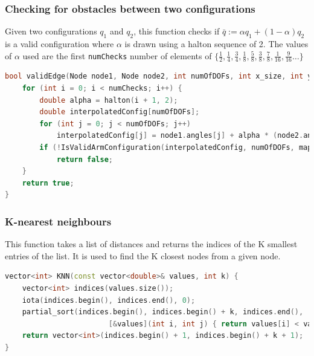 \documentclass[11pt]{article}
\begin{document}
\subsubsection{Checking for obstacles between two configurations}
Given two configurations $q_1$ and $q_2$, this function checks if $\bar{q} := \alpha q_1 + (1 - \alpha) q_2$
is a valid configuration where $\alpha$ is drawn using a halton sequence of 2. The values of $\alpha$
used are the first \texttt{numChecks} number of elements of $\{ \frac{1}{2}, \frac{1}{4}, \frac{3}{4}, \frac{1}{8}, \frac{5}{8}, \frac{3}{8}, \frac{7}{8}, \frac{1}{16}, \frac{9}{16}\dots \}$ 
\begin{lstlisting}[language=c++]
bool validEdge(Node node1, Node node2, int numOfDOFs, int x_size, int y_size, double *map, int numChecks){
    for (int i = 0; i < numChecks; i++) {
        double alpha = halton(i + 1, 2); 
        double interpolatedConfig[numOfDOFs];
        for (int j = 0; j < numOfDOFs; j++) 
            interpolatedConfig[j] = node1.angles[j] + alpha * (node2.angles[j] - node1.angles[j]);
        if (!IsValidArmConfiguration(interpolatedConfig, numOfDOFs, map, x_size, y_size)) 
            return false;
    }
    return true; 
}    
\end{lstlisting}

\subsubsection{K-nearest neighbours}
This function takes a list of distances and returns the indices of the K smallest entries of the list. 
It is used to find the K closest nodes from a given node.
\begin{lstlisting}[language=c++]
vector<int> KNN(const vector<double>& values, int k) {
    vector<int> indices(values.size());
    iota(indices.begin(), indices.end(), 0);
    partial_sort(indices.begin(), indices.begin() + k, indices.end(),
                        [&values](int i, int j) { return values[i] < values[j]; });
    return vector<int>(indices.begin() + 1, indices.begin() + k + 1);
}
\end{lstlisting}
\end{document}
